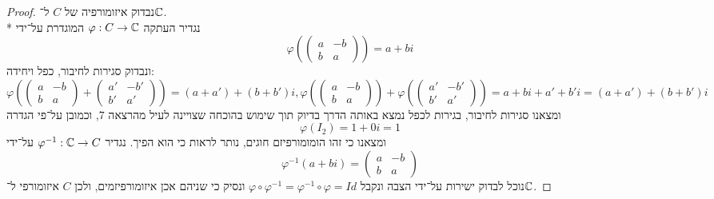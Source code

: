 \begin{proof}
	נבדוק איזומורפיה של $C$ ל־$\mathbb{C}$. \\*
	נגדיר העתקה  $\varphi : C \to \mathbb{C}$ המוגדרת על־ידי
	\[
		\varphi( \begin{pmatrix}
			a & -b \\
			b & a
		\end{pmatrix}) = a + bi
	\]
	ונבדוק סגירות לחיבור, כפל ויחידה:
	\[
		\varphi(\begin{pmatrix}
			a & -b \\
			b & a
		\end{pmatrix} + \begin{pmatrix}
			a' & -b' \\
			b' & a'
		\end{pmatrix})
		= (a + a') + (b + b')i,
		\varphi(\begin{pmatrix}
			a & -b \\
			b & a
		\end{pmatrix}) + \varphi(\begin{pmatrix}
			a' & -b' \\
			b' & a'
		\end{pmatrix})
		= a + bi + a' + b'i
		= (a + a') + (b + b')i
	\]
	ומצאנו סגירות לחיבור, בגירות לכפל נמצא באותה הדרך בדיוק תוך שימוש בהוכחה שצויינה לעיל מהרצאה 7, וכמובן על־פי הגדרה
	\[
		\varphi(I_2) = 1 + 0i = 1
	\]
	ומצאנו כי זהו הומומורפיזם חוגים, נותר לראות כי הוא הפיך.
	נגדיר $\varphi^{-1} : \mathbb{C} \to C$ על־ידי
	\[
		\varphi^{-1}(a + bi)
		= \begin{pmatrix}
			a & -b \\
			b & a
		\end{pmatrix}
	\]
	נוכל לבדוק ישירות על־ידי הצבה ונקבל $\varphi \circ \varphi^{-1} = \varphi^{-1} \circ \varphi = Id$ ונסיק כי שניהם אכן איזומורפיזמים, ולכן $C$ איזומורפי ל־$\mathbb{C}$.
\end{proof}


